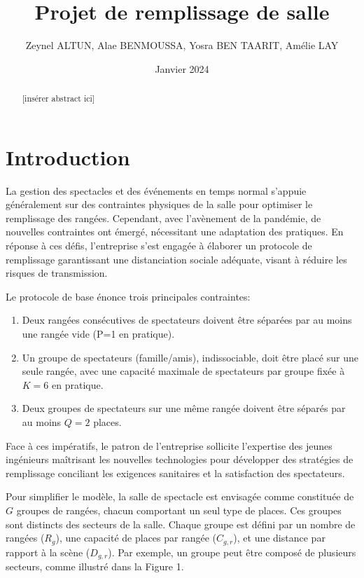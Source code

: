 \documentclass{article}
\title{Projet de remplissage de salle}
\author{Zeynel ALTUN, Alae BENMOUSSA, Yosra BEN TAARIT, Amélie LAY}
\date{Janvier 2024}
\begin{document}
\maketitle

\begin{abstract}
[insérer abstract ici]
\end{abstract}

\section{Introduction}
La gestion des spectacles et des événements en temps normal s'appuie généralement sur des contraintes physiques de la salle pour optimiser le remplissage des rangées. Cependant, avec l'avènement de la pandémie, de nouvelles contraintes ont émergé, nécessitant une adaptation des pratiques. En réponse à ces défis, l'entreprise s'est engagée à élaborer un protocole de remplissage garantissant une distanciation sociale adéquate, visant à réduire les risques de transmission.

Le protocole de base énonce trois principales contraintes: 
\begin{enumerate}
    \item Deux rangées consécutives de spectateurs doivent être séparées par au moins une rangée vide (P=1 en pratique).
    \item Un groupe de spectateurs (famille/amis), indissociable, doit être placé sur une seule rangée, avec une capacité maximale de spectateurs par groupe fixée à \(K=6\) en pratique.
    \item Deux groupes de spectateurs sur une même rangée doivent être séparés par au moins \(Q=2\) places.
\end{enumerate}

Face à ces impératifs, le patron de l'entreprise sollicite l'expertise des jeunes ingénieurs maîtrisant les nouvelles technologies pour développer des stratégies de remplissage conciliant les exigences sanitaires et la satisfaction des spectateurs.

Pour simplifier le modèle, la salle de spectacle est envisagée comme constituée de \(G\) groupes de rangées, chacun comportant un seul type de places. Ces groupes sont distincts des secteurs de la salle. Chaque groupe est défini par un nombre de rangées (\(R_g\)), une capacité de places par rangée (\(C_{g,r}\)), et une distance par rapport à la scène (\(D_{g,r}\)). Par exemple, un groupe peut être composé de plusieurs secteurs, comme illustré dans la Figure 1.
\end{document}
